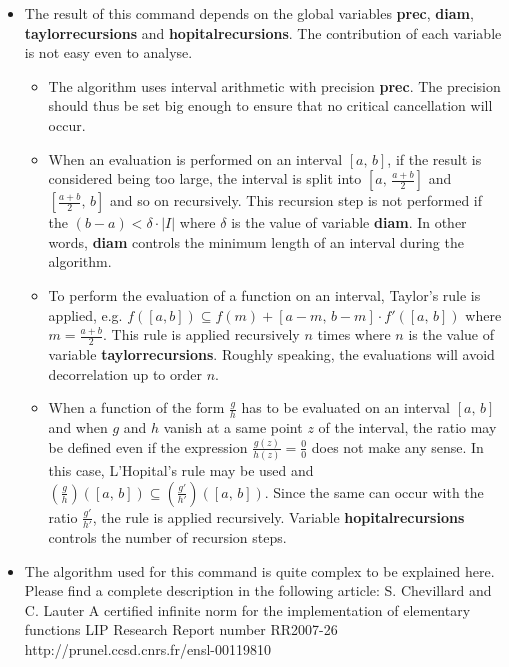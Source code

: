 \begin{itemize}
\item The result of this command depends on the global variables \textbf{prec}, \textbf{diam},
   \textbf{taylorrecursions} and \textbf{hopitalrecursions}. The contribution of each variable is 
   not easy even to analyse.
   \begin{itemize}
   \item  The algorithm uses interval arithmetic with precision \textbf{prec}. The
     precision should thus be set big enough to ensure that no critical
     cancellation will occur.
   \item  When an evaluation is performed on an interval $[a,\,b]$, if the result
     is considered being too large, the interval is split into $[a,\,\frac{a+b}{2}]$
     and $[\frac{a+b}{2},\,b]$ and so on recursively. This recursion step
     is  not performed if the $(b-a) < \delta \cdot |I|$ where $\delta$ is the value
     of variable \textbf{diam}. In other words, \textbf{diam} controls the minimum length of an
     interval during the algorithm.
   \item  To perform the evaluation of a function on an interval, Taylor's rule is
     applied, e.g. $f([a,b]) \subseteq f(m) + [a-m,\,b-m] \cdot f'([a,\,b])$
     where $m=\frac{a+b}{2}$. This rule is applied recursively $n$ times
     where $n$ is the value of variable \textbf{taylorrecursions}. Roughly speaking,
     the evaluations will avoid decorrelation up to order $n$.
   \item  When a function of the form $\frac{g}{h}$ has to be evaluated on an
     interval $[a,\,b]$ and when $g$ and $h$ vanish at a same point
     $z$ of the interval, the ratio may be defined even if the expression
     $\frac{g(z)}{h(z)}=\frac{0}{0}$ does not make any sense. In this case, L'Hopital's rule
     may be used and $\left(\frac{g}{h}\right)([a,\,b]) \subseteq \left(\frac{g'}{h'}\right)([a,\,b])$.
     Since the same can occur with the ratio $\frac{g'}{h'}$, the rule is applied
     recursively. Variable \textbf{hopitalrecursions} controls the number of 
     recursion steps.
   \end{itemize}

\item The algorithm used for this command is quite complex to be explained here. 
   Please find a complete description in the following article:
        S. Chevillard and C. Lauter
        A certified infinite norm for the implementation of elementary functions
        LIP Research Report number RR2007-26
        http://prunel.ccsd.cnrs.fr/ensl-00119810
\end{itemize}
